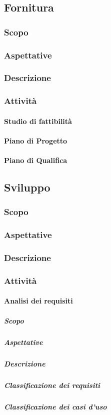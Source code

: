 \documentclass[../norme-di-progetto.tex]{subfiles}
\begin{document}
\subsection{Fornitura}
\subsubsection{Scopo}
\subsubsection{Aspettative}
\subsubsection{Descrizione}
\subsubsection{Attività}
\paragraph{Studio di fattibilità}
\paragraph{Piano di Progetto}
\paragraph{Piano di Qualifica}

\subsection{Sviluppo}
\subsubsection{Scopo}
\subsubsection{Aspettative}
\subsubsection{Descrizione}
\subsubsection{Attività}

\paragraph{Analisi dei requisiti}
\subparagraph{Scopo}
\subparagraph{Aspettative}
\subparagraph{Descrizione}
\subparagraph{Classificazione dei requisiti}
\subparagraph{Classificazione dei casi d'uso}
\end{document}

